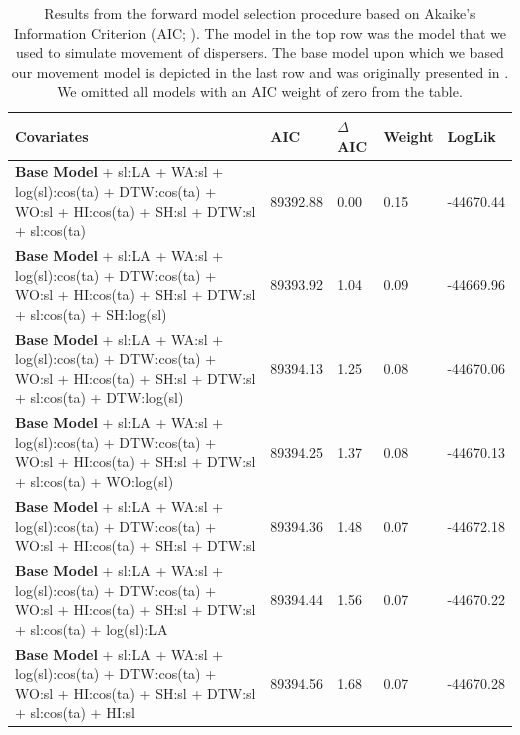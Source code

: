 \documentclass[../FinalThesis.tex]{subfiles}
\begin{document}
\begin{table}[hbpt]
  \caption{Results from the forward model selection procedure based on Akaike's
  Information Criterion (AIC; \citealp{Burnham.2002}). The model in the top row
  was the model that we used to simulate movement of dispersers. The base model
  upon which we based our movement model is depicted in the last row and was
  originally presented in \citet{Hofmann.2021}. We omitted all models with an
  AIC weight of zero from the table.}
  \label{ModelAICs}
  \begin{adjustbox}{max width=1.3\textwidth, angle=90, center}
    \begin{threeparttable}
     \begin{tabular}{lllll}
      \toprule
      Covariates                                                                                                                           & AIC      & \(\Delta\)AIC & Weight & LogLik    \\
      \midrule
      \textbf{Base Model} + sl:LA + WA:sl + log(sl):cos(ta) + DTW:cos(ta) + WO:sl + HI:cos(ta) + SH:sl + DTW:sl + sl:cos(ta)               & 89392.88 & 0.00          & 0.15   & -44670.44 \\
      \textbf{Base Model} + sl:LA + WA:sl + log(sl):cos(ta) + DTW:cos(ta) + WO:sl + HI:cos(ta) + SH:sl + DTW:sl + sl:cos(ta) + SH:log(sl)  & 89393.92 & 1.04          & 0.09   & -44669.96 \\
      \textbf{Base Model} + sl:LA + WA:sl + log(sl):cos(ta) + DTW:cos(ta) + WO:sl + HI:cos(ta) + SH:sl + DTW:sl + sl:cos(ta) + DTW:log(sl) & 89394.13 & 1.25          & 0.08   & -44670.06 \\
      \textbf{Base Model} + sl:LA + WA:sl + log(sl):cos(ta) + DTW:cos(ta) + WO:sl + HI:cos(ta) + SH:sl + DTW:sl + sl:cos(ta) + WO:log(sl)  & 89394.25 & 1.37          & 0.08   & -44670.13 \\
      \textbf{Base Model} + sl:LA + WA:sl + log(sl):cos(ta) + DTW:cos(ta) + WO:sl + HI:cos(ta) + SH:sl + DTW:sl                            & 89394.36 & 1.48          & 0.07   & -44672.18 \\
      \textbf{Base Model} + sl:LA + WA:sl + log(sl):cos(ta) + DTW:cos(ta) + WO:sl + HI:cos(ta) + SH:sl + DTW:sl + sl:cos(ta) + log(sl):LA  & 89394.44 & 1.56          & 0.07   & -44670.22 \\
      \textbf{Base Model} + sl:LA + WA:sl + log(sl):cos(ta) + DTW:cos(ta) + WO:sl + HI:cos(ta) + SH:sl + DTW:sl + sl:cos(ta) + HI:sl       & 89394.56 & 1.68          & 0.07   & -44670.28 \\

\end{tabular}
\end{threeparttable}
\end{adjustbox}
\end{table}
\end{document}
